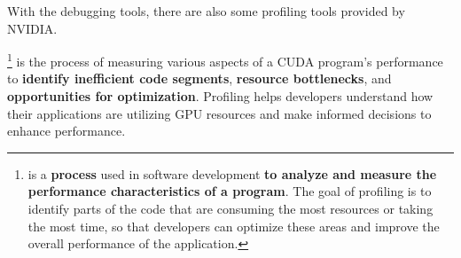 \highspace
With the debugging tools, there are also some profiling tools provided by NVIDIA.

\highspace
{}\footnote{
     is a \textbf{process} used in software development \textbf{to analyze and measure the performance characteristics of a program}. The goal of profiling is to identify parts of the code that are consuming the most resources or taking the most time, so that developers can optimize these areas and improve the overall performance of the application.
}
is the process of measuring various aspects of a CUDA program's performance to \textbf{identify inefficient code segments}, \textbf{resource bottlenecks}, and \textbf{opportunities for optimization}. Profiling helps developers understand how their applications are utilizing GPU resources and make informed decisions to enhance performance.
